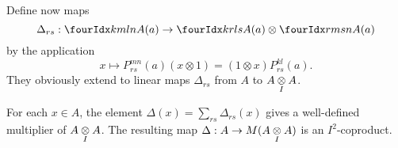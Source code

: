 

Define now maps \[\Delta_{rs}: \Gr{A}{k}{l}{m}{n}(a) \rightarrow \Gr{A}{k}{l}{r}{s}(a)\otimes \Gr{A}{r}{s}{m}{n}(a)\] by the application \[x \mapsto P_{rs}^{mn}(a) (x\otimes 1) = (1\otimes x)P_{rs}^{kl}(a).\] They obviously extend to linear maps $\Delta_{rs}$ from $A$ to $A\underset{I}{\otimes} A$.

\begin{Lem} For each $x\in A$, the element $\Delta(x) = \sum_{rs}\Delta_{rs}(x)$ gives a well-defined multiplier of $A\underset{I}{\otimes} A$. The resulting map $\Delta: A\rightarrow M(A\underset{I}{\otimes} A)$ is an $I^2$-coproduct.
\end{Lem}

